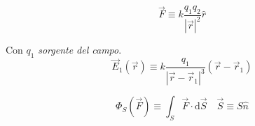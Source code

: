 \begin{multicols}{3}
  \begin{equation}
    \vec{F} \equiv k \frac{q_1q_2}{|\vec{r}|^2}\hat{r}
  \end{equation}

  Con $q_1$ \textit{sorgente del campo}.
  \begin{equation}
    \vec{E}_1(\vec{r}) \equiv k \frac{q_1}{|\vec{r} - \vec{r}_1|^3}(\vec{r} - \vec{r}_1)
  \end{equation}
  
  \begin{equation}
    \Phi_S(\vec{F}) \equiv \int_S \vec{F} \cdot \text{d}\vec{S} \quad \vec{S} \equiv S\hat{n}
  \end{equation}
  
\end{multicols}



